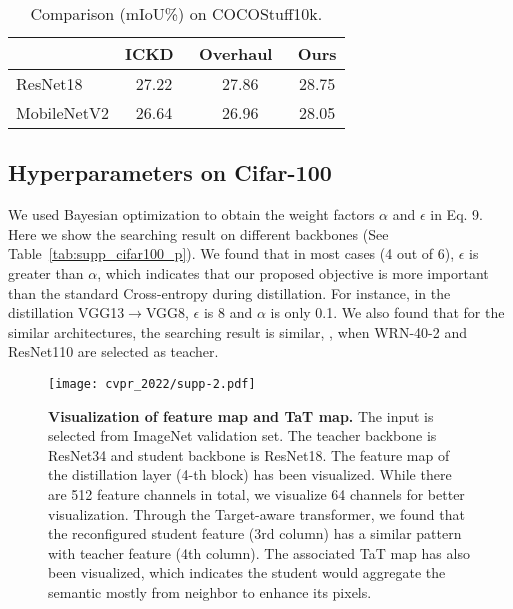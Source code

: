 \documentclass[10pt,letterpaper]{article}
\begin{document}
\begin{table*}[h]
    \centering
    \caption{Comparison (mIoU\%) on COCOStuff10k.}
    \begin{tabular}{l|ccc}
    \toprule
         &ICKD~\cite{Liu2021ICKD} &Overhaul~\cite{Heo2019ACO} &Ours  \\ \midrule
        ResNet18 &27.22 &27.86 &28.75 \\   \midrule
        MobileNetV2 &26.64 &26.96 &28.05 \\
    \bottomrule
    \end{tabular}
    \label{tab:supp_seg}
\end{table*}



\subsection{Hyperparameters on Cifar-100}
We used Bayesian optimization to obtain the weight factors $\alpha$ and $\epsilon$ in Eq. 9. Here we show the searching result on different backbones (See Table~\ref{tab:supp_cifar100_p}). We found that in most cases (4 out of 6), $\epsilon$ is greater than $\alpha$, which indicates that our proposed objective is more important than the standard Cross-entropy during distillation. For instance, in the distillation VGG13$\rightarrow$VGG8, $\epsilon$ is 8 and $\alpha$ is only 0.1. We also found that for the similar architectures, the searching result is similar, \eg, when WRN-40-2 and ResNet110 are selected as teacher.





\begin{figure*}[t]
    \centering
    \texttt{[image: cvpr\_2022/supp-2.pdf]}
    \caption{
    \textbf{Visualization of feature map and TaT map.} The input is selected from ImageNet validation set. The teacher backbone is ResNet34 and student backbone is ResNet18. The feature map of the distillation layer (4-th block) has been visualized. While there are 512 feature channels in total, we visualize 64 channels for better visualization. Through the Target-aware transformer, we found that the reconfigured student feature (3rd column) has a similar pattern with teacher feature (4th column). 
    The associated TaT map has also been visualized, which indicates the student would aggregate the semantic mostly from neighbor to enhance its pixels. 
    }
    \label{fig:supp_vis}
\end{figure*}
\end{document}

